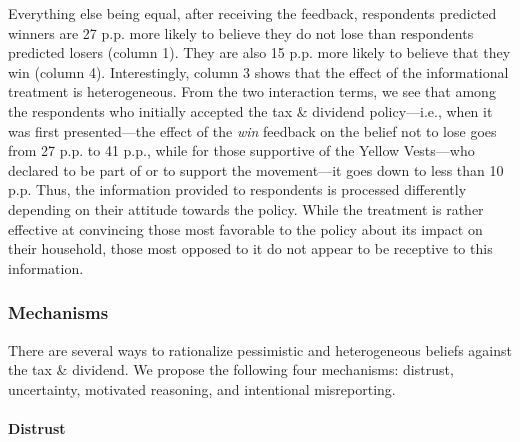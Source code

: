 \documentclass[12pt]{article} %
\begin{document}
Everything else being equal, after receiving the feedback, respondents predicted winners are 27 p.p. more likely to believe they do not lose than respondents predicted losers (column 1). They are also 15 p.p. more likely to believe that they win (column 4). Interestingly, column 3 shows that the effect of the informational treatment is heterogeneous. From the two interaction terms, we see that among the respondents who initially accepted the tax \& dividend policy---i.e., when it was first presented---the effect of the \textit{win} feedback on the belief not to lose goes from 27 p.p. to 41 p.p., while for those supportive of the Yellow Vests---who declared to be part of or to support the movement---it goes down to less than 10 p.p. Thus, the information provided to respondents is processed differently depending on their attitude towards the policy. While the treatment is rather effective at convincing those most favorable to the policy about its impact on their household, those most opposed to it do not appear to be receptive to this information.

\subsubsection{Mechanisms \label{sec:mechanisms}}

There are several ways to rationalize pessimistic and heterogeneous beliefs against the tax \& dividend. We propose the following four mechanisms: distrust, uncertainty, motivated reasoning, and intentional misreporting.

\paragraph{Distrust}
\end{document}

